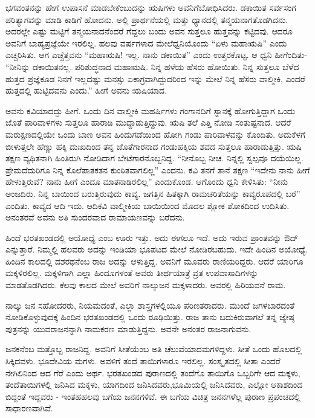 ಭಗವಂತನನ್ನು ಹೇಗೆ ಉಪಾಸನೆ ಮಾಡಬೇಕೆಂಬುದನ್ನು ಋಷಿಗಳು ಅವನಿಗೆ\break ಬೋಧಿಸಿದರು. ಡಕಾಯಿತ ಸರ್ವಸಂಗ ಪರಿತ್ಯಾಗವನ್ನು ಮಾಡಿ ಕಾಡಿಗೆ ಹೋದನು. ಅಲ್ಲಿ ಪ್ರಾರ್ಥನೆಯಲ್ಲಿ ಮತ್ತು ಧ್ಯಾನದಲ್ಲಿ ತನ್ಮಯನಾಗತೊಡಗಿದನು. ಅದರಲ್ಲೇ ಎಷ್ಟು ಮಟ್ಟಿಗೆ ತನ್ಮಯನಾದನೆಂದರೆ ಗೆದ್ದಲು ಬಂದು ಅವನ ಸುತ್ತಲೂ ಹುತ್ತವನ್ನು ಕಟ್ಟಿದವು. ಆದರೂ ಅವನಿಗೆ ಬಾಹ್ಯಪ್ರಜ್ಞೆಯೇ ಇರಲಿಲ್ಲ. ಹಲವು ವರ್ಷಗಳಾದ ಮೇಲೆ\break ಧ್ವನಿಯೊಂದು “ಏಳು ಮಹಾಋಷಿ” ಎಂದು ಎಚ್ಚರಿಸಿತು. ಆಗ ಎಚ್ಚೆತ್ತವನು “ಮಹಾಋಷಿ! ಇಲ್ಲ. ನಾನು ಡಕಾಯಿತ” ಎಂದು ಉತ್ತರಕೊಟ್ಟ. ಆ ಧ್ವನಿ ಹೀಗೆಂದಿತು- “ನೀನಿನ್ನು ಡಕಾಯಿತನಲ್ಲ. ಪರಿಶುದ್ಧನಾದ ಮಹಾಋಷಿ. ನಿನ್ನ ಹಳೆಯ ಹೆಸರು ಹೋಯಿತು. ನಿನ್ನ ಸುತ್ತಲೂ ಬೆಳೆದ ಹುತ್ತದ ಪ್ರಜ್ಞೆಕೂಡ ನಿನಗೆ ಇಲ್ಲದಷ್ಟು ಮನಸ್ಸು ಏಕಾಗ್ರವಾಗಿದ್ದುದರಿಂದ ಇನ್ನು ಮೇಲೆ ನಿನ್ನ ಹೆಸರು ವಾಲ್ಮೀಕಿ, ಎಂದರೆ ಹುತ್ತದಲ್ಲಿ ಹುಟ್ಟಿದವನು ಎಂದು.” ಹೀಗೆ ಅವನು ಋಷಿಯಾದ.

ಅವನು ಕವಿಯಾದದ್ದು ಹೀಗೆ. ಒಂದು ದಿನ ವಾಲ್ಮೀಕಿ ಮಹರ್ಷಿಗಳು ಗಂಗಾನದಿಗೆ ಸ್ನಾನಕ್ಕೆ ಹೋಗುತ್ತಿದ್ದಾಗ ಒಂದು ಜೊತೆ ಪಾರಿವಾಳಗಳು ಸುತ್ತಲೂ ಹಾರಾಡಿ ಮುದ್ದಾಡುತ್ತಿದ್ದುವು. ಋಷಿ ತಲೆ ಎತ್ತಿ ನೋಡಿ ಸಂತುಷ್ಟನಾದ. ಆದರೆ ಮರುಕ್ಷಣದಲ್ಲಿಯೇ ಒಂದು ಬಾಣ ಅವನ ಹಿಂದುಗಡೆಯಿಂದ ಹೋಗಿ ಗಂಡು ಪಾರಿವಾಳವನ್ನು ಕೊಂದಿತು. ಅದು\break ಕೆಳಗೆ ಬೀಳುತ್ತಲೇ ಹೆಣ್ಣು ಹಕ್ಕಿ ದುಃಖದಿಂದ ತನ್ನ ಜೊತೆಗಾರನಾದ ಗಂಡುಹಕ್ಕಿಯ ಶವದ ಸುತ್ತಲೂ ಹಾರಾಡುತ್ತಿತ್ತು. ಋಷಿ ತಕ್ಷಣ ವ್ಯಥಿತನಾಗಿ ಹಿಂತಿರುಗಿ ನೋಡಿದಾಗ ಬೇಟೆಗಾರನೊಬ್ಬನಿದ್ದ. “ನೀನೊಬ್ಬ ನೀಚ. ನಿನ್ನಲ್ಲಿ ಸ್ವಲ್ಪವೂ ದಯೆಯಿಲ್ಲ. ಪ್ರೇಮದೆದುರಿಗೂ ನಿನ್ನ ಕೊಲೆಪಾತಕತನ ಕುಂಠಿತವಾಗಲಿಲ್ಲ” ಎಂದನು. ಕವಿ ತನಗೆ ತಾನೆ ತಕ್ಷಣ “ಇದೇನು ನಾನು ಹೀಗೆ ಹೇಳುತ್ತಿರುವೆ? ನಾನು ಹೀಗೆ ಎಂದೂ ಮಾತನಾಡಿರಲಿಲ್ಲ” ಎಂದುಕೊಂಡ. ಆಗೊಂದು ಧ್ವನಿ ಕೇಳಿಸಿತು: “ನೀನು ಅಂಜದಿರು. ನಿನ್ನ ಬಾಯಿಂದ ಬರುತ್ತಿರುವುದು ಕಾವ್ಯ. ಜಗತ್ತಿನ ಹಿತಕ್ಕಾಗಿ ರಾಮಚರಿತೆಯನ್ನು ಕಾವ್ಯರೂಪದಲ್ಲಿ ಬರೆ” ಎಂದಿತು. ಕಾವ್ಯದ ಆದಿ ಇದು. ಆದಿಕವಿ ವಾಲ್ಮೀಕಿಯ ಬಾಯಿಯಿಂದ ಮೊದಲ ಶ್ಲೋಕ ಶೋಕದಿಂದ ಉದಿಸಿತು. ಅನಂತರವೆ ಅವನು ಅತಿ ಸುಂದರವಾದ ರಾಮಾಯಣವನ್ನು ಬರೆದನು.

ಹಿಂದೆ ಭರತಖಂಡದಲ್ಲಿ ಅಯೋಧ್ಯೆ ಎಂಬ ಊರು ಇತ್ತು. ಅದು ಈಗಲೂ ಇದೆ. ಅದು ಇರುವ ಪ್ರಾಂತವನ್ನು ಔದ್​ ಎನ್ನುತ್ತಾರೆ. ನಿಮ್ಮಲ್ಲಿ ಹಲವರು ಅದನ್ನು ಇಂಡಿಯಾ ಭೂಪಟದ ಮೇಲೆ ನೋಡಿರಬಹುದು. ಇದೇ ಹಿಂದಿನ ಅಯೋಧ್ಯೆ. ಹಿಂದಿನ ಕಾಲದಲ್ಲಿ ದಶರಥನೆಂಬ ರಾಜ ಅದನ್ನು ಆಳುತ್ತಿದ್ದ. ಅವನಿಗೆ ಮೂವರು ರಾಣಿಯರಿದ್ದರು. ಆದರೆ ಯಾರಿಗೂ ಮಕ್ಕಳಿರಲಿಲ್ಲ. ಮಕ್ಕಳಿಗಾಗಿ ಎಲ್ಲಾ ಹಿಂದೂಗಳಂತೆ ಅವರು ತೀರ್ಥಯಾತ್ರೆ ವ್ರತ ಉಪವಾಸಾದಿಗಳನ್ನು ಮಾಡತೊಡಗಿದರು. ಕೆಲವು ಕಾಲದ ಮೇಲೆ ಅವರಿಗೆ ನಾಲ್ಕುಜನ ಮಕ್ಕಳಾದರು. ಅವರಲ್ಲಿ ಹಿರಿಯವನೆ ರಾಮ.

ನಾಲ್ಕು ಜನ ಸಹೋದರರು, ನಿಯಮದಂತೆ, ಎಲ್ಲಾ ಶಾಸ್ತ್ರಗಳಲ್ಲಿಯೂ ಪರಿಣತರಾದರು. ಮುಂದೆ ಜಗಳಬಾರದಂತೆ ನೋಡಿಕೊಳ್ಳುವುದಕ್ಕೆ ಹಿಂದಿನ ಭರತಖಂಡದಲ್ಲಿ ಒಂದು ರೂಢಿಯಿತ್ತು. ರಾಜ ತಾನು ಬದುಕಿರುವಾಗಲೆ ತನ್ನ ಜ್ಯೇಷ್ಠ ಪುತ್ರನನ್ನು ಯುವರಾಜನನ್ನಾಗಿ ನಾಮಕರಣ ಮಾಡುತ್ತಿದ್ದನು. ಅವನೇ ಅನಂತರ ರಾಜನಾಗುವನು.

ಜನಕನೆಂಬ ಮತ್ತೊಬ್ಬ ರಾಜನಿದ್ದ. ಅವನಿಗೆ ಸೀತೆಯೆಂಬ ಅತಿ ಚೆಲುವೆಯಾದ\break ಮಗಳಿದ್ದಳು. ಸೀತೆ ಒಂದು ಹೊಲದಲ್ಲಿ ಸಿಕ್ಕಿದವಳು. ಭೂದೇವಿಯ ಮಗಳು. ಅವಳಿಗೆ ತಂದೆ ತಾಯಿಗಳಾರೂ ಇರಲಿಲ್ಲ. ಸಂಸ್ಕೃತದಲ್ಲಿ ಸೀತಾ ಎಂದರೆ ನೇಗಿಲಿನಿಂದ ಆದ ಗೆರೆ ಎಂದು ಅರ್ಥ. ಭರತಖಂಡದ ಪುರಾಣದಲ್ಲಿ ತಂದೆಗೊ ತಾಯಿಗೊ ಒಬ್ಬರಿಗೇ ಆದ ಮಕ್ಕಳು, ತಂದೆತಾಯಿಗಳಲ್ಲಿ ಜನಿಸಿದ ಮಕ್ಕಳು, ಯಾಗದಿಂದ ಜನಿಸಿದವರು,\break ಭೂಮಿಯಲ್ಲಿ ಜನಿಸಿದವರು, ಎಲ್ಲೋ ಆಕಾಶದಿಂದ ಬಿದ್ದಂತೆ ಇದ್ದವರು - ಇಂತಹ\break ಹಲವು ಬಗೆಯ ಜನನಗಳಿವೆ. ಈ ಬಗೆಯ ವಿಚಿತ್ರ ಜನನಗಳೆಲ್ಲ ಪುರಾಣ ಪ್ರಪಂಚದಲ್ಲಿ ಸಾಧಾರಣವಾಗಿವೆ.

